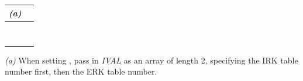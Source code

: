 \documentclass[letterpaper,10pt,english]{sphinxmanual}
\begin{document}
\begin{tabulary}{\linewidth}{|L|L|}
 \emph{(a)}
 & 
{\hyperref[c_interface/User_callable:ARKodeSetARKTableNum]{}}
\\\hline

 & 
{\hyperref[c_interface/User_callable:ARKodeSetMaxNumSteps]{}}
\\\hline

 & 
{\hyperref[c_interface/User_callable:ARKodeSetMaxHnilWarns]{}}
\\\hline

 & 
{\hyperref[c_interface/User_callable:ARKodeSetPredictorMethod]{}}
\\\hline

 & 
{\hyperref[c_interface/User_callable:ARKodeSetMaxErrTestFails]{}}
\\\hline

 & 
{\hyperref[c_interface/User_callable:ARKodeSetMaxConvFails]{}}
\\\hline

 & 
{\hyperref[c_interface/User_callable:ARKodeSetMaxNonlinIters]{}}
\\\hline

 & 
{\hyperref[c_interface/User_callable:ARKodeSetSmallNumEFails]{}}
\\\hline

 & 
{\hyperref[c_interface/User_callable:ARKodeSetMaxStepsBetweenLSet]{}}
\\\hline
\end{tabulary}


\emph{(a)} When setting , pass in \emph{IVAL} as an array of
length 2, specifying the IRK table number first, then the ERK table
number.
\end{document}

